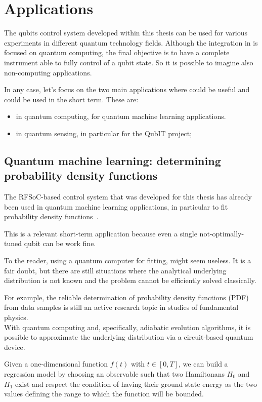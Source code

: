 \chapter{Applications}

The qubits control system developed within this thesis can be used for various experiments in different quantum technology fields.
Although the integration in \Qibolab is focused on quantum computing, the final objective is to have a complete instrument able to fully control of a qubit state.
So it is possible to imagine also non-computing applications.

In any case, let's focus on the two main applications where \Qibosoq could be useful and could be used in the short term. These are:
\begin{itemize}
    \item in quantum computing, for quantum machine learning applications.
    \item in quantum sensing, in particular for the QubIT project;
\end{itemize}


\section{Quantum machine learning: determining probability density functions}
\label{sec:qml_application}

The RFSoC-based control system that was developed for this thesis has already been used in quantum machine learning applications, in particular to fit probability density functions~\cite{Robbiati2023}.

This is a relevant short-term application because even a single not-optimally-tuned qubit can be work fine.

To the reader, using a quantum computer for fitting, might seem useless. 
It is a fair doubt, but there are still situations where the analytical underlying distribution is not known and the problem cannot be efficiently solved classically.

For example, the reliable determination of probability density functions (PDF) from data samples is still an active research topic in studies of fundamental physics.\\
With quantum computing and, specifically, adiabatic evolution algorithms, it is possible to approximate the underlying distribution via a circuit-based quantum device.

Given a one-dimensional function $f(t)$ with $t\in [0, T]$, we can build a regression model by choosing an observable such that two Hamiltonans $H_0$ and $H_1$ exist and respect the condition of having their ground state energy as the two values defining the range to which the function will be bounded.

